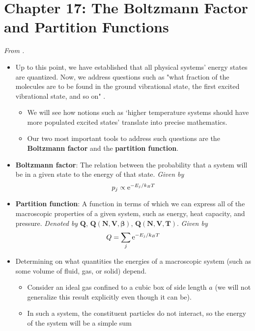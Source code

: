 \documentclass[../notes.tex]{subfiles}
\begin{document}
\section{Chapter 17: The Boltzmann Factor and Partition Functions}
\emph{From \textcite{bib:McQuarrieSimon}.}
\begin{itemize}
    \item {}Up to this point, we have established that all physical systems' energy states are quantized. Now, we address questions such as "what fraction of the molecules are to be found in the ground vibrational state, the first excited vibrational state, and so on" \parencite[693]{bib:McQuarrieSimon}.
    \begin{itemize}
        \item We will see how notions such as `higher temperature systems should have more populated excited states' translate into precise mathematics.
        \item Our two most important tools to address such questions are the \textbf{Boltzmann factor} and the \textbf{partition function}.
    \end{itemize}
    \item \textbf{Boltzmann factor}: The relation between the probability that a system will be in a given state to the energy of that state. \emph{Given by}
    \begin{equation*}
        p_j \propto \e[-E_j/k_BT]
    \end{equation*}
    \item \textbf{Partition function}: A function in terms of which we can express all of the macroscopic properties of a given system, such as energy, heat capacity, and pressure. \emph{Denoted by} $\bm{Q}$, $\bm{Q(N,V,\beta)}$, $\bm{Q(N,V,T)}$. \emph{Given by}
    \begin{equation*}
        Q = \sum_j\e[-E_j/k_BT]
    \end{equation*}
    \item Determining on what quantities the energies of a macroscopic system (such as some volume of fluid, gas, or solid) depend.
    \begin{itemize}
        \item Consider an ideal gas confined to a cubic box of side length $a$ (we will not generalize this result explicitly even though it can be).
        \item In such a system, the constituent particles do not interact, so the energy of the system will be a simple sum
        \begin{equation*}

\end{equation*}
\end{itemize}
\end{itemize}
\end{document}
